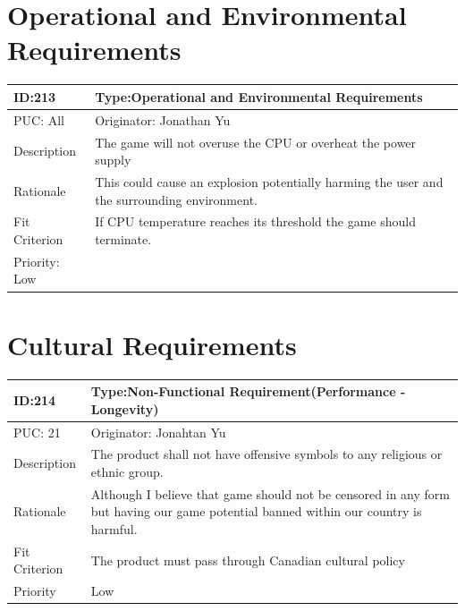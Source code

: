 \documentclass{article}
\begin{document}
	\section{Operational and Environmental Requirements}
	\begin{table}[H]
		\begin{tabular}{|l|l|l|}
			\hline
			ID:213 & \multicolumn{2}{l|}{Type:Operational and Environmental Requirements} \\ \hline
			PUC: All & \multicolumn{2}{l|}{Originator: Jonathan Yu} \\ \hline
			Description & \multicolumn{2}{m{0.85\textwidth}|}{The game will not overuse the CPU or overheat the power supply} \\ \hline
			Rationale & \multicolumn{2}{m{0.85\textwidth}|}{This could cause an explosion potentially harming the user and the surrounding environment.} \\ \hline
			Fit Criterion & \multicolumn{2}{m{0.85\textwidth}|}{If CPU temperature reaches its threshold the game should terminate.} \\ \hline
			Priority: Low \\ \hline
		\end{tabular}
	\end{table}

	\section{Cultural Requirements}
	\begin{table}[H]
		\begin{tabular}{|l|l|l|}
			\hline
			ID:214 & \multicolumn{2}{l|}{Type:Non-Functional Requirement(Performance - Longevity)} \\ \hline
			PUC: 21 & \multicolumn{2}{l|}{Originator: Jonahtan Yu} \\ \hline
			Description & \multicolumn{2}{m{0.85\textwidth}|}{The product shall not have offensive symbols to any religious or ethnic group.} \\ \hline
			Rationale & \multicolumn{2}{m{0.85\textwidth}|}{Although I believe that game should not be censored in any form but having our game potential banned within our country is harmful.} \\ \hline
			Fit Criterion & \multicolumn{2}{m{0.85\textwidth}|}{The product must pass through Canadian cultural policy} \\ \hline
			Priority& \multicolumn{2}{m{0.85\textwidth}|}{Low }\\ \hline
		\end{tabular}
	\end{table}
\end{document}
